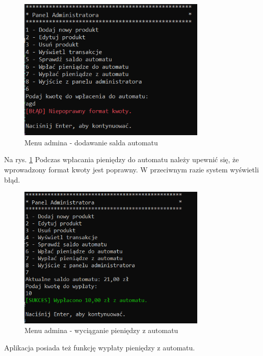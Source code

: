 \begin{figure}[H] 
    \centering
    \includegraphics[width=0.8\textwidth]{grafiki/blad_wplata.png}
    \caption{\footnotesize Menu admina - dodawanie salda automatu}	
    \label{fig:5.20}
\end{figure}

Na rys. \ref{fig:5.20} Podczas wpłacania pieniędzy do automatu należy upewnić się, że wprowadzony format kwoty jest poprawny. W przeciwnym razie system wyświetli błąd.

\begin{figure}[H] 
    \centering
    \includegraphics[width=0.8\textwidth]{grafiki/wyplacanie_pieniedzy.png}
    \caption{\footnotesize Menu admina - wyciąganie pieniędzy z automatu}	
    \label{fig:5.21}
\end{figure}

Aplikacja posiada też funkcję wypłaty pieniędzy z automatu.

